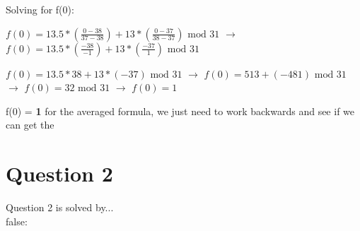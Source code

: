 \documentclass[10pt]{article}
\begin{document}
\noindent Solving for f(0):\\ \vspace{0.1in}

$f(0) = 13.5*\left(\frac{0 - 38}{37 - 38}\right) + 13*\left(\frac{0 - 37}{38 - 37}\right) \textrm{ mod } 31$
$\rightarrow$
$f(0) = 13.5*\left(\frac{-38}{-1}\right) + 13*\left(\frac{-37}{1}\right)  \textrm{ mod } 31$
\vspace{0.1in}

$f(0) = 13.5*38 + 13*(-37)  \textrm{ mod } 31$
$\rightarrow$
$f(0) = 513 + (-481)  \textrm{ mod } 31$
$\rightarrow$
$f(0) = 32  \textrm{ mod } 31$
$\rightarrow$
$f(0) = 1$

\vspace{0.1in}
\noindent f(0) = \textbf{1} for the averaged formula, we just need to work backwards and see if we can get the 

\vspace{0.2in}
\section{Question 2}
\noindent Question 2 is solved by...
\vspace{0.2in}
\\








\if false:
\end{document}
